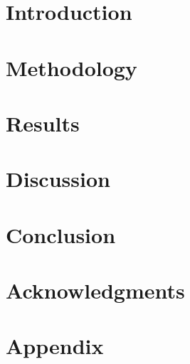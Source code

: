\documentclass[preprint,12pt]{elsarticle} %
\begin{document}
\section{Introduction}
\label{ch:introduction}


\section{Methodology}
\label{ch:method}


\section{Results}
\label{ch:results}



\section{Discussion}
\label{ch:discussion}


\section{Conclusion}
\label{ch:conclusion}


\section{Acknowledgments}
\label{ch:acknowledgments}


\section{Appendix}
\label{ch:appendix}



   
  
\end{document}
